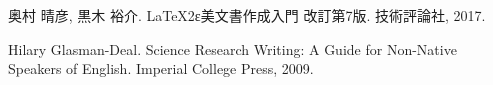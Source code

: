 \documentclass[a4paper,11pt]{jreport}
\begin{document}
\newpage

\renewcommand{\bibname}{参考文献}




\begin{thebibliography}{1}
奥村 晴彦, 黒木 裕介.
\newblock LaTeX2ε美文書作成入門 改訂第7版.
\newblock 技術評論社, 2017.

Hilary Glasman-Deal.
\newblock Science Research Writing: A Guide for Non-Native Speakers of English.
\newblock Imperial College Press, 2009.
\end{thebibliography}
\end{document}
